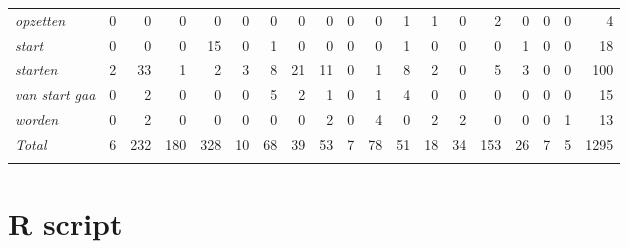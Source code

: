 \begin{table}
{\begin{tabular}{>{\itshape}lrrrrrrrrrrrrrrrrrr}
opzetten &  0 &  0 &  0 &  0 &  0 &  0 &  0 &  0 &  0 &  0 &  1 &  1 &  0 &  2 &  0 &  0 &  0 &  4\\
start &  0 &  0 &  0 &  15 &  0 &  1 &  0 &  0 &  0 &  0 &  1 &  0 &  0 &  0 &  1 &  0 &  0 &  18\\
starten &  2 &  33 &  1 &  2 &  3 &  8 &  21 &  11 &  0 &  1 &  8 &  2 &  0 &  5 &  3 &  0 &  0 &  100\\
van start gaa &  0 &  2 &  0 &  0 &  0 &  5 &  2 &  1 &  0 &  1 &  4 &  0 &  0 &  0 &  0 &  0 &  0 &  15\\
worden &  0 &  2 &  0 &  0 &  0 &  0 &  0 &  2 &  0 &  4 &  0 &  2 &  2 &  0 &  0 &  0 &  1 &  13\\
\midrule
\normalfont Total & 6 &  232 &  180 &  328 &  10 &  68 &  39 &  53 &  7 &  78 &  51 &  18 &  34 &  153 &  26 &  7 &  5 &  1295\\
\lspbottomrule
\end{tabular}
}
\end{table} 

\chapter{R script}\label{ch:B}


